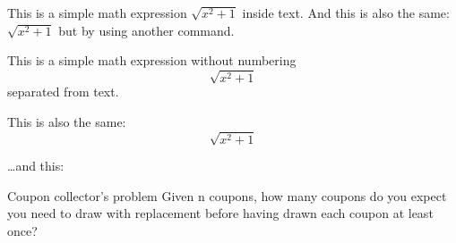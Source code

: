 \documentclass{article}
\begin{document}
This is a simple math expression \(\sqrt{x^2+1}\) inside text. 
And this is also the same: 
\begin{math}
\sqrt{x^2+1}
\end{math}
but by using another command.

This is a simple math expression without numbering
\[\sqrt{x^2+1}\] 
separated from text.

This is also the same:
\begin{displaymath}
\sqrt{x^2+1}
\end{displaymath}

\ldots and this:

Coupon collector's problem
Given n coupons, how many coupons do you expect you need to draw with replacement before having drawn each coupon at least once?
\end{document}
